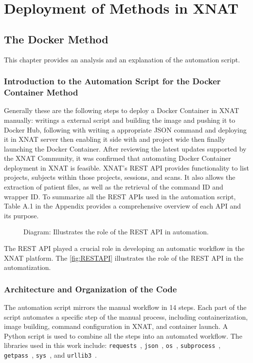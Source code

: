 \chapter{Deployment of Methods in XNAT}
\section{The Docker Method}
This chapter provides an analysis and an explanation of the automation script.

\subsection{Introduction to the Automation Script for the Docker Container Method}
Generally these are the following steps to deploy a Docker Container in XNAT manually: writings a external script and building the image and pushing it to Docker Hub, following with writing a appropriate JSON command and deploying it in XNAT server then enabling it side with and project wide then finally launching the Docker Container. 
After reviewing the latest updates supported by the XNAT Community, it was confirmed that automating Docker Container deployment in XNAT is feasible.
XNAT's REST API provides functionality to list projects, subjects within those projects, sessions, and scans. It also allows the extraction of patient files, as well as the retrieval of the command \ac{ID} and wrapper \ac{ID}.
To summarize all the REST APIs used in the automation script, Table A.1 in the Appendix provides a comprehensive overview of each API and its purpose.

\begin{figure}[H]
    \centering
    \def\svgwidth{0.4\linewidth}
    
    \caption{ Diagram: Illustrates the role of the REST API in automation.}
    \label{fig:RESTAPI}
\end{figure}


The REST API played a crucial role in developing an automatic workflow in the XNAT platform. The \autoref{fig:RESTAPI} illustrates the role of the REST API in the automatization.



\subsection{Architecture and Organization of the Code}
The automation script mirrors the manual workflow in 14 steps. Each part of the script automates a specific step of the manual process, including containerization, image building, command configuration in XNAT, and container launch. A Python script is used to combine all the steps into an automated workflow. The libraries used in this work include: \texttt{requests}~\cite{request}, \texttt{json}~\cite{pythonjson}, \texttt{os}~\cite{os}, \texttt{subprocess}~\cite{subprocess}, \texttt{getpass}~\cite{getpass}, \texttt{sys}~\cite{sys}, and \texttt{urllib3}~\cite{urllib3}. 

